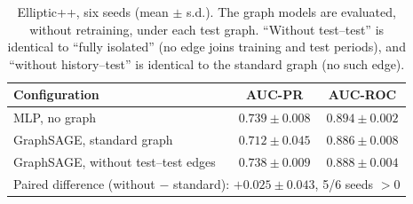 \begin{table}[t]
\centering
\caption{Elliptic++, six seeds (mean $\pm$ s.d.). The graph models are evaluated, without retraining, under each test graph. ``Without test--test'' is identical to ``fully isolated'' (no edge joins training and test periods), and ``without history--test'' is identical to the standard graph (no such edge).}
\label{tab:elliptic_multiseed}
\small
\begin{tabular}{lcc}
\hline
Configuration & AUC-PR & AUC-ROC \\
\hline
MLP, no graph & $0.739\pm0.008$ & $0.894\pm0.002$ \\
GraphSAGE, standard graph & $0.712\pm0.045$ & $0.886\pm0.008$ \\
GraphSAGE, without test--test edges & $0.738\pm0.009$ & $0.888\pm0.004$ \\
\hline
\multicolumn{3}{l}{Paired difference (without $-$ standard): $+0.025\pm0.043$, 5/6 seeds $>0$} \\
\hline
\end{tabular}
\end{table}
